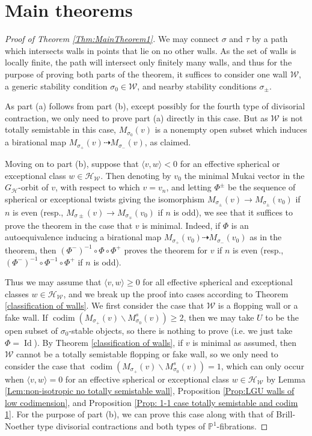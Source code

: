 \documentclass[leqno,11pt]{amsart}
\def\P{\ensuremath{\mathbb{P}}}
\def\codim{\mathop{\mathrm{codim}}\nolimits}
\def\Id{\mathop{\mathrm{Id}}\nolimits}
\theoremstyle{definition}
\def\P{\ensuremath{\mathbb{P}}}
\def\HH{\ensuremath{\mathcal H}}
\def\WW{\ensuremath{\mathcal W}}
\begin{document}
\section{Main theorems}
\begin{proof}[Proof of Theorem \ref{Thm:MainTheorem1}]
We may connect $\sigma$ and $\tau$ by a path which intersects walls in points that lie on no other walls.  As the set of walls is locally finite, the path will intersect only finitely many walls, and thus for the purpose of proving both parts of the theorem, it suffices to consider one wall $\WW$, a generic stability condition $\sigma_0\in\WW$, and nearby stability conditions $\sigma_\pm$.  

As part (a) follows from part (b), except possibly for the fourth type of divisorial contraction, we only need to prove part (a) directly in this case.  But as $\WW$ is not totally semistable in this case, $M_{\sigma_0}(v)$ is a nonempty open subset which induces a birational map $M_{\sigma_+}(v)\dashrightarrow M_{\sigma_-}(v)$, as claimed.

Moving on to part (b), suppose that $\langle v,w\rangle<0$ for an effective spherical or exceptional class $w\in\HH_\WW$.  Then denoting by $v_0$ the minimal Mukai vector in the $G_\HH$-orbit of $v$, with respect to which $v=v_n$, and letting $\Phi^\pm$ be the sequence of spherical or exceptional twists giving the isomorphism $M_{\sigma_\pm}(v)\to M_{\sigma_\pm}(v_0)$ if $n$ is even (resp., $M_{\sigma\pm}(v)\to M_{\sigma_\mp}(v_0)$ if $n$ is odd), we see that it suffices to prove the theorem in the case that $v$ is minimal.  Indeed, if $\Phi$ is an autoequivalence inducing a birational map $M_{\sigma_+}(v_0)\dashrightarrow M_{\sigma_-}(v_0)$ as in the theorem, then $(\Phi^-)^{-1}\circ\Phi\circ\Phi^+$ proves the theorem for $v$ if $n$ is even (resp., $(\Phi^-)^{-1}\circ\Phi^{-1}\circ\Phi^+$ if $n$ is odd).

Thus we may assume that $\langle v,w\rangle\geq 0$ for all effective spherical and exceptional classes $w\in\HH_\WW$, and we break up the proof into cases according to Theorem \ref{classification of walls}.  We first consider the case that $\WW$ is a flopping wall or a fake wall.  If $\codim(M_{\sigma_+}(v)\backslash M_{\sigma_0}^s(v))\geq 2$, then we may take $U$ to be the open subset of $\sigma_0$-stable objects, so there is nothing to prove (i.e. we just take $\Phi=\Id$).  By Theorem \ref{classification of walls}, if $v$ is minimal as assumed, then $\WW$ cannot be a totally semistable flopping or fake wall, so we only need to consider the case that $\codim(M_{\sigma_+}(v)\backslash M_{\sigma_0}^s(v))=1$, which can only occur when $\langle v,w\rangle=0$ for an effective spherical or exceptional class $w\in\HH_\WW$ by Lemma \ref{Lem:non-isotropic no totally semistable wall}, Proposition \ref{Prop:LGU walls of low codimension}, and Proposition \ref{Prop: 1-1 case totally semistable and codim 1}.  For the purpose of part (b), we can prove this case along with that of Brill-Noether type divisorial contractions and both types of $\P^1$-fibrations.


\end{proof}
\end{document}
